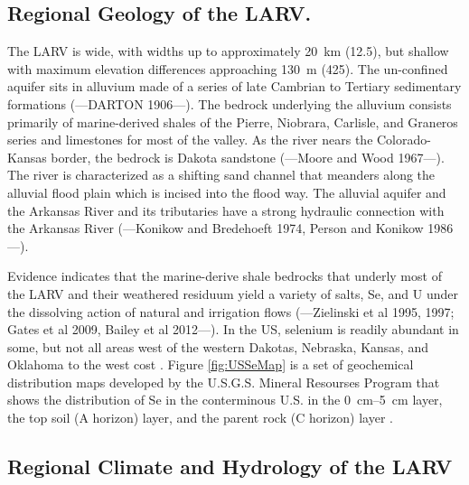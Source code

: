 \begin{linenumbers}[1]
\subsection*{Regional Geology of the LARV.}
The LARV is wide, with widths up to approximately \SI{20}{\kilo\meter} (\SI{12.5}{\mile}), but shallow with maximum elevation differences approaching \SI{130}{\meter} (\SI{425}{\foot}).  The un-confined aquifer sits in alluvium made of a series of late Cambrian to Tertiary sedimentary formations (---DARTON 1906---).  The bedrock underlying the alluvium consists primarily of marine-derived shales of the Pierre, Niobrara, Carlisle, and Graneros series and limestones for most of the valley.  As the river nears the Colorado-Kansas border, the bedrock is Dakota sandstone (---Moore and Wood 1967---).  The river is characterized as a shifting sand channel that meanders along the alluvial flood plain which is incised into the flood way.  The alluvial aquifer and the Arkansas River and its tributaries have a strong hydraulic connection with the Arkansas River (---Konikow and Bredehoeft 1974, Person and Konikow 1986---).

Evidence indicates that the marine-derive shale bedrocks that underly most of the LARV and their weathered residuum yield a variety of salts, Se, and U under the dissolving action of natural and irrigation flows (---Zielinski et al 1995, 1997; Gates et al 2009, Bailey et al 2012---).  In the US, selenium is readily abundant in some, but not all areas west of the western Dakotas, Nebraska, Kansas, and Oklahoma to the west cost \citep{Painter1940}.  Figure \ref{fig:USSeMap} is a set of geochemical distribution maps developed by the U.S.G.S. Mineral Resourses Program that shows the distribution of Se in the conterminous U.S. in the \SIrange{0}{5}{\centi\meter} layer, the top soil (A horizon) layer, and the parent rock (C horizon) layer \citep{2014Smith}.


\subsection*{Regional Climate and Hydrology of the LARV}


\end{linenumbers}
